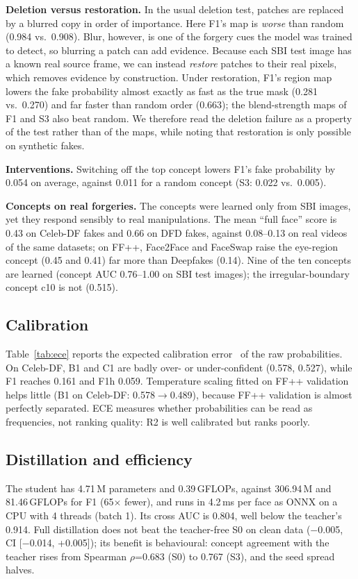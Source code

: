 \documentclass[conference]{IEEEtran}
\begin{document}
\textbf{Deletion versus restoration.} In the usual deletion test, patches are replaced by a blurred copy in order
of importance. Here F1's map is \emph{worse} than random (0.984 vs.\ 0.908). Blur, however, is one of the forgery
cues the model was trained to detect, so blurring a patch can add evidence. Because each SBI test image has a known
real source frame, we can instead \emph{restore} patches to their real pixels, which removes evidence by
construction. Under restoration, F1's region map lowers the fake probability almost exactly as fast as the true
mask (0.281 vs.\ 0.270) and far faster than random order (0.663); the blend-strength maps of F1 and S3 also beat
random. We therefore read the deletion failure as a property of the test rather than of the maps, while noting that
restoration is only possible on synthetic fakes.

\textbf{Interventions.} Switching off the top concept lowers F1's fake probability by 0.054 on average, against
0.011 for a random concept (S3: 0.022 vs.\ 0.005).

\textbf{Concepts on real forgeries.} The concepts were learned only from SBI images, yet they respond sensibly to
real manipulations. The mean ``full face'' score is 0.43 on Celeb-DF fakes and 0.66 on DFD fakes, against 0.08--0.13
on real videos of the same datasets; on FF++, Face2Face and FaceSwap raise the eye-region concept (0.45 and 0.41)
far more than Deepfakes (0.14). Nine of the ten concepts are learned (concept AUC 0.76--1.00 on SBI test images);
the irregular-boundary concept c10 is not (0.515).



\subsection{Calibration}
Table~\ref{tab:ece} reports the expected calibration error~\cite{guo} of the raw probabilities. On Celeb-DF, B1 and
C1 are badly over- or under-confident (0.578, 0.527), while F1 reaches 0.161 and F1h 0.059. Temperature scaling fitted on
FF++ validation helps little (B1 on Celeb-DF: 0.578$\to$0.489), because FF++ validation is almost perfectly
separated. ECE measures whether probabilities can be read
as frequencies, not ranking quality: R2 is well calibrated but ranks poorly.

\subsection{Distillation and efficiency}
The student has 4.71\,M parameters and 0.39\,GFLOPs, against 306.94\,M and 81.46\,GFLOPs for F1 (65$\times$
fewer), and runs in 4.2\,ms per face as ONNX on a CPU with 4 threads (batch 1). Its cross AUC is 0.804, well below the
teacher's 0.914. Full distillation does not beat the teacher-free S0 on clean data ($-$0.005, CI [$-$0.014,
+0.005]); its benefit is behavioural: concept agreement with the teacher rises from Spearman $\rho$=0.683 (S0) to
0.767 (S3), and the seed spread halves.
\end{document}
